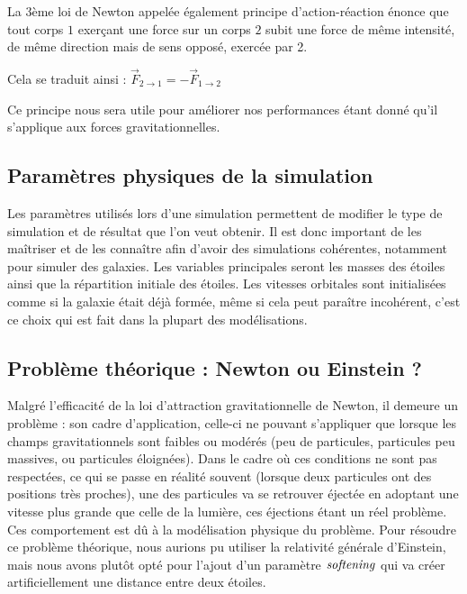 La 3ème loi de Newton appelée également principe d'action-réaction énonce que tout corps $1$ exerçant une force sur un corps $2$ subit une force de même intensité, de même direction mais de sens opposé, exercée par 2.

\vspace{2mm}

Cela se traduit ainsi :
$\vec{F}_{2 \rightarrow 1} = -\vec{F}_{1 \rightarrow 2}  $

\vspace{2mm}
Ce principe nous sera utile pour améliorer nos performances étant donné qu'il s'applique aux forces gravitationnelles.


\vspace{3mm}
\subsection{Paramètres physiques de la simulation}
\vspace{2mm}

Les paramètres utilisés lors d'une simulation permettent de modifier le type de simulation et de résultat que l'on veut obtenir. Il est donc important de les maîtriser et de les connaître afin d'avoir des simulations cohérentes, notamment pour simuler des galaxies. Les variables principales seront les masses des étoiles ainsi que la répartition initiale des étoiles. Les vitesses orbitales sont initialisées comme si la galaxie était déjà formée, même si cela peut paraître incohérent, c'est ce choix qui est fait dans la plupart des modélisations.

\vspace{3mm}
\subsection{Problème théorique : Newton ou Einstein ?}
\vspace{2mm}

Malgré l'efficacité de la loi d'attraction gravitationnelle de Newton, il demeure un problème : son cadre d'application, celle-ci ne pouvant s'appliquer que lorsque les champs gravitationnels sont faibles ou modérés (peu de particules, particules peu massives, ou particules éloignées). Dans le cadre où ces conditions ne sont pas respectées, ce qui se passe en réalité souvent (lorsque deux particules ont des positions très proches), une des particules va se retrouver éjectée en adoptant une vitesse plus grande que celle de la lumière, ces éjections étant un réel problème. Ces comportement est dû à la modélisation physique  du problème. Pour résoudre ce problème théorique, nous aurions pu utiliser la relativité générale d'Einstein, mais nous avons plutôt opté pour l'ajout d'un paramètre $\it{softening}$ qui va créer artificiellement une distance entre deux étoiles.

